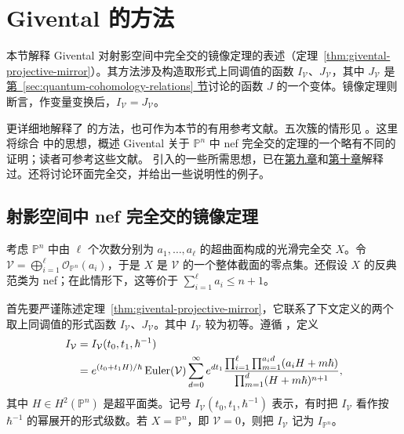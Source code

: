 \section{Givental 的方法}\label{sec:givental-mirror-approach}
本节解释 Givental 对射影空间中完全交的镜像定理的表述（定理~\ref{thm:givental-projective-mirror}）。其方法涉及构造取形式上同调值的函数 $I_{\mathcal V}$、$J_{\mathcal V}$，其中 $J_{\mathcal V}$ 是\hyperref[sec:quantum-cohomology-relations]{第~\ref*{sec:quantum-cohomology-relations} 节}讨论的函数 $J$ 的一个变体。镜像定理则断言，作变量变换后，$I_{\mathcal V}=J_{\mathcal V}$。

 更详细地解释了  的方法，也可作为本节的有用参考文献。五次簇的情形见 。这里将综合  中的思想，概述 Givental 关于 $\mathbb P^n$ 中 nef 完全交的定理的一个略有不同的证明；读者可参考这些文献。 引入的一些所需思想，已在\hyperref[chap:localization]{第九章}和\hyperref[chap:quantum-differential-equations]{第十章}解释过。还将讨论环面完全交，并给出一些说明性的例子。
\subsection{射影空间中 nef 完全交的镜像定理}\label{subsec:givental-nef-projective-mirror}
考虑 $\mathbb P^n$ 中由 $\ell$ 个次数分别为 $a_1,\ldots,a_\ell$ 的超曲面构成的光滑完全交 $X$。令 $\mathcal V=\bigoplus_{i=1}^{\ell}\mathcal O_{\mathbb P^n}(a_i)$，于是 $X$ 是 $\mathcal V$ 的一个整体截面的零点集。还假设 $X$ 的反典范类为 nef；在此情形下，这等价于 $\sum_{i=1}^{\ell}a_i\le n+1$。

首先要严谨陈述定理~\ref{thm:givental-projective-mirror}，它联系了下文定义的两个取上同调值的形式函数 $I_{\mathcal V}$、$J_{\mathcal V}$。其中 $I_{\mathcal V}$ 较为初等。遵循 ，定义
\begin{equation}\label{eq:givental-complete-intersection-i-function}\index{I函数@$I$ 函数|hyperpage}
\begin{aligned}
I_{\mathcal V}&=I_{\mathcal V}(t_0,t_1,\hbar^{-1})\\
&=e^{(t_0+t_1H)/\hbar}\operatorname{Euler}(\mathcal V)
\sum_{d=0}^{\infty}e^{dt_1}
\frac{\prod_{i=1}^{\ell}\prod_{m=1}^{a_id}(a_iH+m\hbar)}
{\prod_{m=1}^d(H+m\hbar)^{n+1}},
\end{aligned}
\end{equation}
其中 $H\in H^2(\mathbb P^n)$ 是超平面类。记号 $I_{\mathcal V}(t_0,t_1,\hbar^{-1})$ 表示，有时把 $I_{\mathcal V}$ 看作按 $\hbar^{-1}$ 的幂展开的形式级数。若 $X=\mathbb P^n$，即 $\mathcal V=0$，则把 $I_{\mathcal V}$ 记为 $I_{\mathbb P^n}$。

